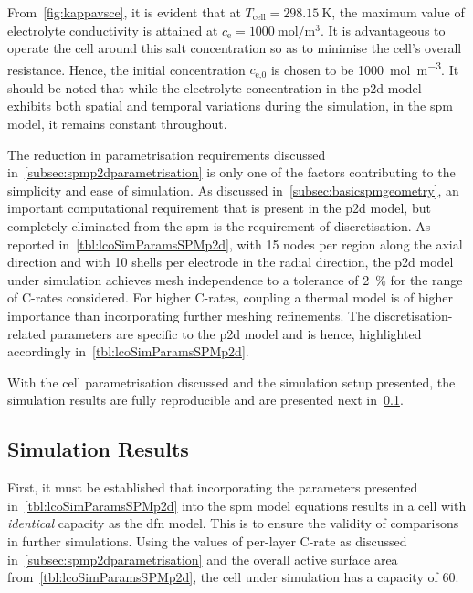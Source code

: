 From~\cref{fig:kappavsce},       it        is       evident        that       at
$T_\text{cell}=\SI{298.15}{\kelvin}$,   the   maximum   value   of   electrolyte
conductivity is attained at  $c_\text{e} = \SI{1000}{\mole\per\meter\cubed}$. It
is advantageous  to operate  the cell  around this salt  concentration so  as to
minimise  the  cell's  overall  resistance.  Hence,  the  initial  concentration
$c_\text{e,0}$ is  chosen to  be \SI{1000}{\mole\per\meter\cubed}. It  should be
noted that while  the electrolyte concentration in the  \gls{p2d} model exhibits
both spatial  and temporal  variations during the  simulation, in  the \gls{spm}
model, it remains constant throughout.

The      reduction      in      parametrisation      requirements      discussed
in~\cref{subsec:spmp2dparametrisation}    is   only    one   of    the   factors
contributing  to   the  simplicity   and  ease   of  simulation.   As  discussed
in~\cref{subsec:basicspmgeometry},   an   important  computational   requirement
that   is  present   in   the  \gls{p2d}   model,   but  completely   eliminated
from  the   \gls{spm}  is  the   requirement  of  discretisation.   As  reported
in~\cref{tbl:lcoSimParamsSPMp2d},  with  15 nodes  per  region  along the  axial
direction  and  with 10  shells  per  electrode  in  the radial  direction,  the
\gls{p2d}  model under  simulation  achieves mesh  independence  to a  tolerance
of  \approx   \SI{2}{\percent}  for  the   range  of  C-rates   considered.  For
higher  C-rates,  coupling  a  thermal   model  is  of  higher  importance  than
incorporating further meshing refinements. The discretisation-related parameters
are  specific to  the  \gls{p2d}  model and  is  hence, highlighted  accordingly
in~\cref{tbl:lcoSimParamsSPMp2d}.

With  the cell  parametrisation discussed  and the  simulation setup  presented,
the  simulation   results  are  fully   reproducible  and  are   presented  next
in~\cref{subsec:simresultsbasicspm}.

\subsection{Simulation Results}\label{subsec:simresultsbasicspm}

First,  it  must be  established  that  incorporating the  parameters  presented
in~\cref{tbl:lcoSimParamsSPMp2d} into the \gls{spm} model equations results in a
cell with  \emph{identical} capacity as the  \gls{dfn} model. This is  to ensure
the  validity  of  comparisons  in  further simulations.  Using  the  values  of
per-layer  C-rate as  discussed  in~\cref{subsec:spmp2dparametrisation} and  the
overall active  surface area from~\cref{tbl:lcoSimParamsSPMp2d}, the  cell under
simulation has a capacity of \SI{60}{\amphour}.

